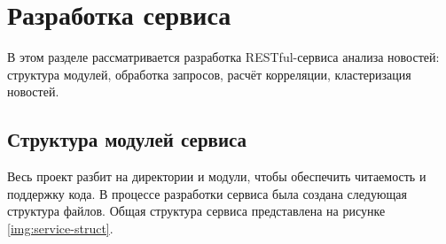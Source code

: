 \section{Разработка сервиса}

В этом разделе рассматривается разработка RESTful-сервиса анализа новостей: структура модулей, обработка запросов, расчёт корреляции, кластеризация новостей.

\subsection{Структура модулей сервиса}

Весь проект разбит на директории и модули, чтобы обеспечить читаемость и поддержку кода. В процессе разработки сервиса была создана следующая структура файлов. Общая структура сервиса представлена на рисунке \ref{img:service-struct}.

